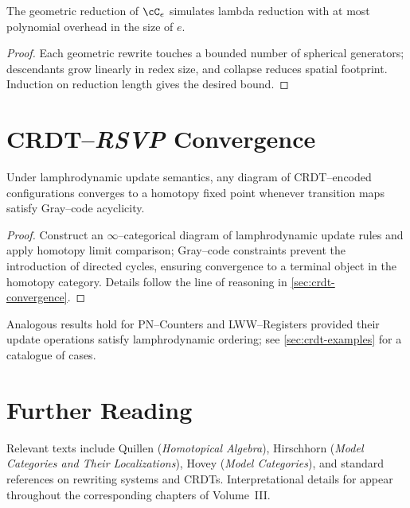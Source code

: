 \begin{lemma}
The geometric reduction of $\cC_e$ simulates lambda reduction with at
most polynomial overhead in the size of $e$.
\end{lemma}

\begin{proof}
Each geometric rewrite touches a bounded number of spherical
generators; descendants grow linearly in redex size, and collapse
reduces spatial footprint.  Induction on reduction length gives the
desired bound.
\end{proof}

\section{CRDT--\textit{RSVP} Convergence}
\label{app:crdt-proof}

\begin{proposition}
Under lamphrodynamic update semantics, any diagram of CRDT--encoded
configurations converges to a homotopy fixed point whenever
transition maps satisfy Gray--code acyclicity.
\end{proposition}

\begin{proof}
Construct an $\infty$--categorical diagram of lamphrodynamic update
rules and apply homotopy limit comparison; Gray--code constraints
prevent the introduction of directed cycles, ensuring convergence to a
terminal object in the homotopy category.  Details follow the line of
reasoning in \cref{sec:crdt-convergence}.
\end{proof}

\begin{remark}
Analogous results hold for PN--Counters and LWW--Registers provided
their update operations satisfy lamphrodynamic ordering; see
\cref{sec:crdt-examples} for a catalogue of cases.
\end{remark}

\section{Further Reading}

Relevant texts include Quillen (\emph{Homotopical Algebra}), Hirschhorn
(\emph{Model Categories and Their Localizations}), Hovey (\emph{Model
Categories}), and standard references on rewriting systems and CRDTs.
Interpretational details for \rsvpabbr{} appear throughout the
corresponding chapters of Volume~III.

